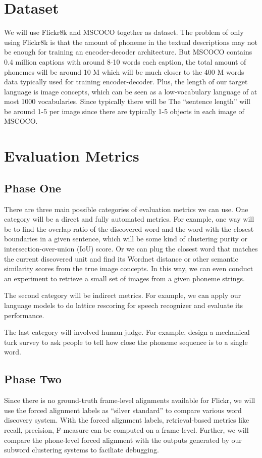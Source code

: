 \documentclass[a4paper]{article}
\begin{document}
\section{Dataset}
We will use Flickr8k and MSCOCO together as dataset. The problem of only using Flickr8k is that the amount of phoneme in the textual descriptions may not be enough for training an encoder-decoder architecture. But MSCOCO contains 0.4 million captions with around 8-10 words each caption, the total amount of phonemes will be around 10 M which will be much closer to the 400 M words data typically used for training encoder-decoder. Plus, the length of our target language
is image concepts, which can be seen as a low-vocabulary language of at most 1000 vocabularies. Since typically there will be  The ``sentence length'' will be around 1-5 per image since there are typically 1-5 objects in each image of MSCOCO.  

\section{Evaluation Metrics}
\subsection{Phase One}
There are three main possible categories of evaluation metrics we can use. One category will be a direct and fully automated metrics. For example, one way will be to find the overlap ratio of the discovered word and the word with the closest boundaries in a given sentence, which will be some kind of clustering purity or intersection-over-union (IoU) score. Or we can
plug the closest word that matches the current discovered unit and find its Wordnet distance or other semantic similarity scores from the true image concepts. In this way, we can even conduct an experiment to retrieve a small set of images from a given phoneme strings.

The second category will be indirect metrics. For example, we can apply our language models to do lattice rescoring for speech recognizer and evaluate its performance.

The last category will involved human judge. For example, design a mechanical turk survey to ask people to tell how close the phoneme sequence is to a single word.

\subsection{Phase Two}
Since there is no ground-truth frame-level alignments available for Flickr, we will use the forced alignment labels as ``silver standard'' to compare various word discovery system. With the forced alignment labels, retrieval-based metrics like recall, precision, F-measure can be computed on a frame-level. Further, we will compare the phone-level forced alignment with the outputs generated by our subword clustering systems to faciliate debugging. 
\end{document}
